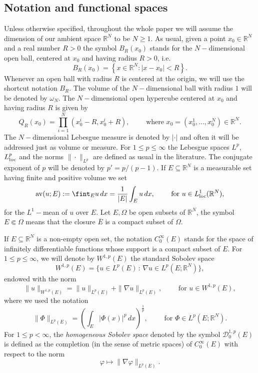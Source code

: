 \documentclass{amsart}
\theoremstyle{definition}
\numberwithin{equation}{section}
\begin{document}
	\subsection{Notation and functional spaces}
	Unless otherwise specified, throughout the whole paper we will assume the dimension of our ambient space $\mathbb{R}^N$ to be $N \ge 1$. As usual, given a point $x_0 \in \mathbb{R}^N$ and a real number $R > 0$ the symbol $B_R(x_0)$ stands for the $N-$dimensional open ball, centered at $x_0$ and having radius $R > 0$, i.e.
	\[
	B_R(x_0) = \left\{x \in \mathbb{R}^N : |x-x_0| < R\right\}. 
	\] 
	Whenever an open ball with radius $R$ is centered at the origin, we will use the shortcut notation $B_R$. The volume of the $N-$dimensional ball with radius $1$ will be denoted by $\omega_N$. The $N-$dimensional open hypercube centered at $x_0$ and having radius $R$ is given by 
	\[
	Q_R(x_0) = \prod_{i=1}^{N} (x_0^i - R, x_0^i + R), \qquad \mbox{ where } x_0=(x_0^1, \ldots, x_0^N) \in \mathbb{R}^N.
	\] 
	The $N-$dimensional Lebesgue measure is denoted by $|\cdot|$ and often it will be addressed just as volume or measure. For $1 \le p \le \infty$ the Lebesgue spaces $L^p$, $L^p_{\rm loc}$ and the norms $\|\cdot\|_{L^p}$ are defined as usual in the literature. The conjugate exponent of $p$ will be denoted by $p' = p/(p-1)$. If $E \subseteq \mathbb{R}^N$ is a measurable set having finite and positive volume we set 
	\[
	{\rm av}(u; E) := \fint_{E} u\,dx = \frac{1}{|E|} \int_E u\,dx, \qquad \mbox{ for } u \in L^1_{\rm loc}(\mathbb{R}^N),
	\]
	for the $L^1-$mean of $u$ over $E$.  Let $E, \Omega$ be open subsets of $\mathbb{R}^N$, the symbol $E \Subset \Omega$ means that the closure $\overline{E}$ is a compact subset of $\Omega$. 
	\par 
	If $E\subseteq\mathbb{R}^N$ is a non-empty open set, the notation $C^\infty_0(E)$ stands for the space of infinitely differentiable functions whose support is a compact subset of $E$. For $1\le p \leq \infty$, we will denote by $W^{1,p}(E)$ 
	the standard Sobolev space
	\[
	W^{1,p}(E)=\Big\{u\in L^p(E)\, :\, \nabla u\in L^p(E;\mathbb{R}^N)\Big\},
	\]
	endowed with the norm\[
	\|u\|_{W^{1,p}(E)} = \|u\|_{L^p(E)} + \|\nabla u\|_{L^p(E)}, \qquad \mbox{ for } u \in W^{1,p}(E),
	\] 
	where we used the notation \[
	\|\Phi\|_{L^p(E)} = \left(\int_{E} |\Phi(x)|^p\,dx\right)^{\frac{1}{p}}, \qquad \mbox{ for } \Phi \in L^p(E; \mathbb{R}^N).
	\]
	For $1 \leq p < \infty$, the {\it homogeneous Sobolev space} denoted by the symbol $\mathcal{D}^{1,p}_0(E)$ is defined as the completion (in the sense of metric spaces) of $C^\infty_0(E)$ with respect to the norm \[
	\varphi \mapsto \|\nabla \varphi\|_{L^p(E)}.
	\]
\end{document}
